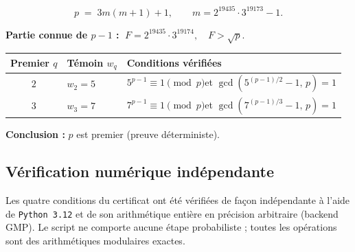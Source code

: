 \begin{resultbox}[title={\textbf{Certificat} — premier de 29\,998 chiffres}]
\[
  p \;=\; 3m(m+1)+1,\qquad m = 2^{19435}\cdot 3^{19173}-1.
\]

\medskip
\noindent\textbf{Partie connue de $p-1$ :}
$\;F = 2^{19435}\cdot 3^{19174},\quad F > \sqrt{p}.\quad$\checkmark

\medskip
\renewcommand{\arraystretch}{1.4}
\begin{tabular}{@{}c l l@{}}
\toprule
Premier $q$ & Témoin $w_q$ & Conditions vérifiées \\
\midrule
$2$ & $w_2 = 5$ &
  $5^{p-1}\equiv 1\pmod{p}$\quad et\quad
  $\gcd(5^{(p-1)/2}-1,\,p)=1$ \\
$3$ & $w_3 = 7$ &
  $7^{p-1}\equiv 1\pmod{p}$\quad et\quad
  $\gcd(7^{(p-1)/3}-1,\,p)=1$ \\
\bottomrule
\end{tabular}

\medskip
\noindent\textbf{Conclusion :} $p$ est premier (preuve déterministe). \checkmark
\end{resultbox}

\subsection{Vérification numérique indépendante}

Les quatre conditions du certificat ont été vérifiées de façon indépendante
à l'aide de \texttt{Python 3.12} et de son arithmétique entière en précision
arbitraire (backend GMP). Le script ne comporte aucune étape probabiliste ;
toutes les opérations sont des arithmétiques modulaires exactes.

